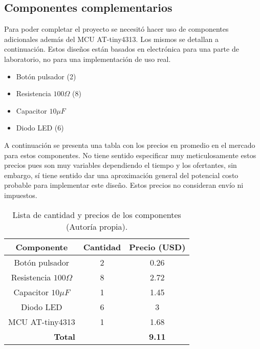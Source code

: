 \subsection{Componentes complementarios}
Para poder completar el proyecto se necesitó hacer uso de componentes adicionales además del MCU AT-tiny4313. Los mismos se detallan a continuación. Estos diseños están basados en electrónica para una parte de laboratorio, no para una implementación de uso real.

\begin{itemize}
    \item Botón pulsador (2)
    \item Resistencia $100\Omega$ (8)
    \item Capacitor $10\mu F$
    \item Diodo LED (6)
\end{itemize}

A continuación se presenta una tabla con los precios en promedio en el mercado para estos componentes. No tiene sentido especificar muy meticulosamente estos precios pues son muy variables dependiendo el tiempo y los ofertantes, sin embargo, sí tiene sentido dar una aproximación general del potencial costo probable para implementar este diseño. Estos precios no consideran envío ni impuestos.


\begin{table}[H]
\centering
\begin{tabular}{|cc|c|}
\hline
\multicolumn{1}{|c|}{\textbf{Componente}} & \textbf{Cantidad} & \textbf{Precio (USD)} \\ \hline
\multicolumn{1}{|c|}{Botón pulsador}        & 2                 & 0.26             \\ \hline
\multicolumn{1}{|c|}{Resistencia $100\Omega$}        & 8                 & 2.72              \\ \hline
\multicolumn{1}{|c|}{Capacitor $10\mu F$}        & 1                 & 1.45              \\ \hline
\multicolumn{1}{|c|}{Diodo LED}        & 6                 & 3              \\ \hline
\multicolumn{1}{|c|}{MCU AT-tiny4313}        & 1                 & 1.68              \\ \hline
\multicolumn{2}{|c|}{\textbf{Total}}                          & \textbf{9.11}    \\ \hline
\end{tabular}
\label{componentes}
\caption{Lista de cantidad y precios de los componentes (Autoría propia).}
\end{table}